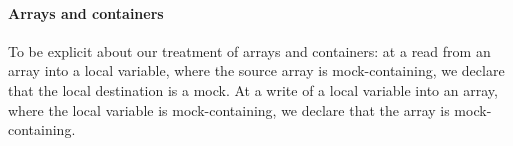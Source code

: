 

\paragraph{Arrays and containers}

To be explicit about our treatment of arrays and containers: at a read from an array into a local variable, where the source array is mock-containing, we declare that the local destination is a mock. At a write of a local variable into an array, where the local variable is mock-containing, we declare that the array is mock-containing.




